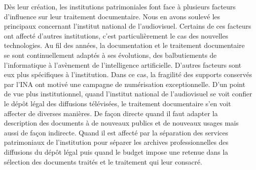 
Dès leur création, les institutions patrimoniales font face à plusieurs facteurs d'influence sur leur traitement documentaire. Nous en avons soulevé les principaux concernant l'institut national de l'audiovisuel. Certains de ces facteurs ont affecté d'autres institutions, c'est particulièrement le cas des nouvelles technologies. Au fil des années, la documentation et le traitement documentaire se sont continuellement adaptés à ses évolutions, des balbutiements de l'informatique à l'avènement de l'intelligence artificielle. D'autres facteurs sont eux plus spécifiques à l'institution. Dans ce cas, la fragilité des supports conservés par l'INA ont motivé une campagne de numérisation exceptionnelle. D'un point de vue plus institutionnel, quand l'institut national de l'audiovisuel se voit confier le dépôt légal des diffusions télévisées, le traitement documentaire s'en voit affecter de diverses manières. De façon directe quand il faut adapter la description des documents à de nouveaux publics et de nouveaux usages mais aussi de façon indirecte. Quand il est affecté par la séparation des services patrimoniaux de l'institution pour séparer les archives professionnelles des diffusions du dépôt légal puis quand le budget impose une retenue dans la sélection des documents traités et le traitement qui leur consacré. 


